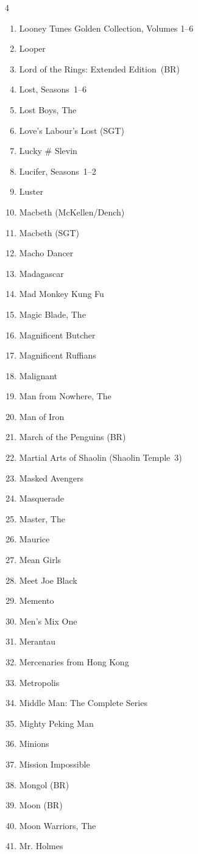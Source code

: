 \documentclass{article}
\begin{document}
\begin{multicols}{4}
\begin{enumerate}
\item Looney Tunes Golden Collection, Volumes 1--6
\item Looper
\item Lord of the Rings: Extended Edition~(BR)
\item Lost, Seasons~1--6
\item Lost Boys, The
\item Love's Labour's Lost (SGT)
\item Lucky \# Slevin
\item Lucifer, Seasons~1--2
\item Luster
\item Macbeth (McKellen/Dench)
\item Macbeth (SGT)
\item Macho Dancer
\item Madagascar
\item Mad Monkey Kung Fu
\item Magic Blade, The
\item Magnificent Butcher
\item Magnificent Ruffians
\item Malignant
\item Man from Nowhere, The
\item Man of Iron
\item March of the Penguins (BR)
\item Martial Arts of Shaolin (Shaolin Temple~3)
\item Masked Avengers
\item Masquerade
\item Master, The
\item Maurice
\item Mean Girls
\item Meet Joe Black
\item Memento
\item Men's Mix One
\item Merantau
\item Mercenaries from Hong Kong
\item Metropolis
\item Middle Man: The Complete Series
\item Mighty Peking Man
\item Minions
\item Mission Impossible
\item Mongol (BR)
\item Moon (BR)
\item Moon Warriors, The
\item Mr. Holmes

\end{enumerate}
\end{multicols}
\end{document}
